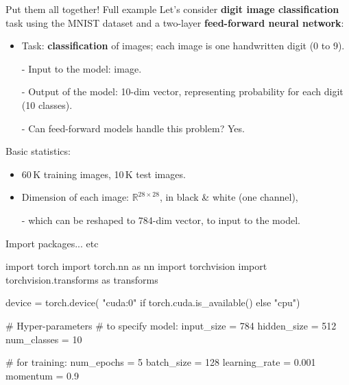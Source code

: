 \begin{frame}{Put them all together! Full example}
Let's consider \textbf{digit image classification} task using the MNIST dataset  and a two-layer \textbf{feed-forward neural network}:
\pause
\vsp
\begin{itemize}
\item Task: \textbf{classification} of images; each image is one handwritten digit (0 to 9).
\item[-] Input to the model: image.
\item[-] Output of the model: 10-dim vector, representing probability for each digit (10 classes).
\item[-] Can feed-forward models handle this problem? Yes.
\end{itemize}
\pause
\vsp
Basic statistics:
\begin{itemize}
\item 60\,K training images, 10\,K test images.
\item Dimension of each image: $\mathbb{R}^{28 \times 28}$, in black \& white (one channel),
\item[-] which can be reshaped to 784-dim vector, to input to the model.
\end{itemize}
\end{frame}

\begin{frame}[fragile]{Import packages... etc}
\vspace{-5mm}
\begin{python}
import torch
import torch.nn as nn
import torchvision
import torchvision.transforms as transforms
\end{python}

\begin{python}
device = torch.device(
    "cuda:0" if torch.cuda.is_available() else "cpu")
\end{python}

\begin{python}
# Hyper-parameters
# to specify model:
input_size = 784
hidden_size = 512
num_classes = 10

# for training:
num_epochs = 5
batch_size = 128
learning_rate = 0.001
momentum = 0.9
\end{python}
\end{frame}

